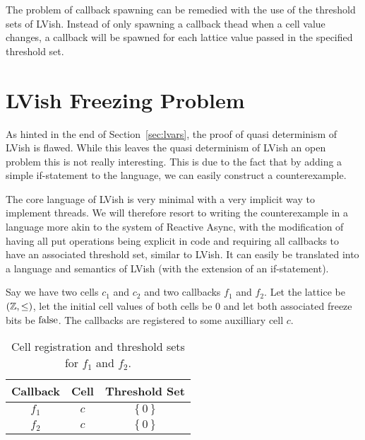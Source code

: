 The problem of callback spawning can be remedied with the use of the threshold
sets of LVish. Instead of only spawning a callback thead when a cell value
changes, a callback will be spawned for each lattice value passed in the
specified threshold set.



\section{LVish Freezing Problem}%
\label{sec:a_problem_of_lvish}

As hinted in the end of Section~\ref{sec:lvars}, the proof of quasi determinism
of LVish is flawed. While this leaves the quasi determinism of LVish an open
problem this is not really interesting. This is due to the fact that by adding a
simple if-statement to the language, we can easily construct a counterexample.

The core language of LVish is very minimal with a very implicit way to implement
threads. We will therefore resort to writing the counterexample in a language
more akin to the system of Reactive Async, with the modification of having all
put operations being explicit in code and requiring all callbacks to have an
associated threshold set, similar to LVish. It can easily be translated into a
language and semantics of LVish (with the extension of an if-statement).

Say we have two cells $c_1$ and $c_2$ and two callbacks $f_1$ and $f_2$. Let the
lattice be $(\mathbb{Z}, \leq)$, let the initial cell values of both cells be 
$0$ and let both associated freeze bits be $\mathrm{false}$. The
callbacks are registered to some auxilliary cell $c$. 

\begin{table}
  \centering
  \begin{tabular}{c|c|c}
    Callback & Cell & Threshold Set \\
    \hline
    $f_1$ & $c$ & $\left\{ 0 \right\}$ \\
    $f_2$ & $c$ & $\left\{ 0 \right\}$ \\
  \end{tabular}
  \caption{Cell registration and threshold sets for $f_1$ and $f_2$.}
  \label{tab:cellreg}
\end{table}

